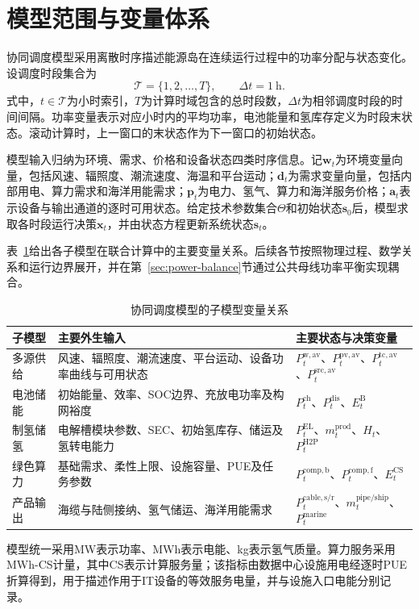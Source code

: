 \section{模型范围与变量体系}
\label{sec:symbols}

协同调度模型采用离散时序描述能源岛在连续运行过程中的功率分配与状态变化。设调度时段集合为
\begin{equation}
\mathcal T=\{1,2,\ldots,T\},\qquad \Delta t=1~\mathrm{h}.
\label{eq:common-sets}
\end{equation}
式中，$t\in\mathcal T$为小时索引，$T$为计算时域包含的总时段数，$\Delta t$为相邻调度时段的时间间隔。功率变量表示对应小时内的平均功率，电池能量和氢库存定义为时段末状态。滚动计算时，上一窗口的末状态作为下一窗口的初始状态。

模型输入归纳为环境、需求、价格和设备状态四类时序信息。记$\bm w_t$为环境变量向量，包括风速、辐照度、潮流速度、海温和平台运动；$\bm d_t$为需求变量向量，包括内部用电、算力需求和海洋用能需求；$\bm p_t$为电力、氢气、算力和海洋服务价格；$\bm a_t$表示设备与输出通道的逐时可用状态。给定技术参数集合$\Theta$和初始状态$\bm s_0$后，模型求取各时段运行决策$\bm x_t$，并由状态方程更新系统状态$\bm s_t$。

表~\ref{tab:module-responsibility}给出各子模型在联合计算中的主要变量关系。后续各节按照物理过程、数学关系和运行边界展开，并在第~\ref{sec:power-balance}节通过公共母线功率平衡实现耦合。

\begin{table}[H]
\centering
\caption{协同调度模型的子模型变量关系}
\label{tab:module-responsibility}
\begin{tabularx}{\textwidth}{p{2.2cm}X X}
\toprule
子模型 & 主要外生输入 & 主要状态与决策变量\\
\midrule
多源供给 & 风速、辐照度、潮流速度、平台运动、设备功率曲线与可用状态 &
$P_t^{\mathrm{w,av}}$、$P_t^{\mathrm{pv,av}}$、$P_t^{\mathrm{tc,av}}$、$P_t^{\mathrm{src,av}}$\\
电池储能 & 初始能量、效率、SOC边界、充放电功率及构网裕度 &
$P_t^{\mathrm{ch}}$、$P_t^{\mathrm{dis}}$、$E_t^{\mathrm B}$\\
制氢储氢 & 电解槽模块参数、SEC、初始氢库存、储运及氢转电能力 &
$P_t^{\mathrm{EL}}$、$m_t^{\mathrm{prod}}$、$H_t$、$P_t^{\mathrm{H2P}}$\\
绿色算力 & 基础需求、柔性上限、设施容量、PUE及任务参数 &
$P_t^{\mathrm{comp,b}}$、$P_t^{\mathrm{comp,f}}$、$E_t^{\mathrm{CS}}$\\
产品输出 & 海缆与陆侧接纳、氢气储运、海洋用能需求 &
$P_t^{\mathrm{cable,s/r}}$、$m_t^{\mathrm{pipe/ship}}$、$P_t^{\mathrm{marine}}$\\
\bottomrule
\end{tabularx}
\end{table}

模型统一采用MW表示功率、MWh表示电能、kg表示氢气质量。算力服务采用MWh-CS计量，其中CS表示计算服务量；该指标由数据中心设施用电经逐时PUE折算得到，用于描述作用于IT设备的等效服务电量，并与设施入口电能分别记录。
